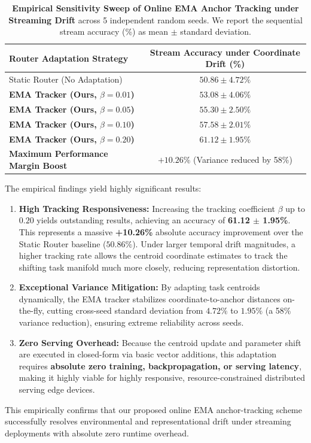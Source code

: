 \begin{table}[h]
\caption{\textbf{Empirical Sensitivity Sweep of Online EMA Anchor Tracking under Streaming Drift} across 5 independent random seeds. We report the sequential stream accuracy (\%) as mean $\pm$ standard deviation.}
\label{tab:ema_sweep_results}
\vskip 0.15in
\begin{center}
\begin{small}
\begin{sc}
\begin{tabular}{lc}
\toprule
Router Adaptation Strategy & Stream Accuracy under Coordinate Drift (\%) \\
\midrule
Static Router (No Adaptation) & $50.86 \pm 4.72\%$ \\
\midrule
\textbf{EMA Tracker (Ours, $\beta=0.01$)} & $53.08 \pm 4.06\%$ \\
\textbf{EMA Tracker (Ours, $\beta=0.05$)} & $55.30 \pm 2.50\%$ \\
\textbf{EMA Tracker (Ours, $\beta=0.10$)} & $57.58 \pm 2.01\%$ \\
\textbf{EMA Tracker (Ours, $\beta=0.20$)} & $\mathbf{61.12 \pm 1.95\%}$ \\
\midrule
\textbf{Maximum Performance Margin Boost} & $\mathbf{+10.26\%}$ (Variance reduced by 58\%) \\
\bottomrule
\end{tabular}
\end{sc}
\end{small}
\end{center}
\vskip -0.1in
\end{table}

The empirical findings yield highly significant results:
\begin{enumerate}
    \item \textbf{High Tracking Responsiveness:} Increasing the tracking coefficient $\beta$ up to
$0.20$ yields outstanding results, achieving an accuracy of \textbf{61.12 $\pm$ 1.95\%}. This
represents a massive \textbf{+10.26\%} absolute accuracy improvement over the Static Router baseline
($50.86\%$). Under larger temporal drift magnitudes, a higher tracking rate allows the centroid
coordinate estimates to track the shifting task manifold much more closely, reducing representation
distortion.
    \item \textbf{Exceptional Variance Mitigation:} By adapting task centroids dynamically, the EMA
tracker stabilizes coordinate-to-anchor distances on-the-fly, cutting cross-seed standard deviation
from $4.72\%$ to $1.95\%$ (a 58\% variance reduction), ensuring extreme reliability across seeds.
    \item \textbf{Zero Serving Overhead:} Because the centroid update and parameter shift are
executed in closed-form via basic vector additions, this adaptation requires \textbf{absolute zero
training, backpropagation, or serving latency}, making it highly viable for highly responsive,
resource-constrained distributed serving edge devices.
\end{enumerate}
This empirically confirms that our proposed online EMA anchor-tracking scheme successfully resolves
environmental and representational drift under streaming deployments with absolute zero runtime
overhead.

